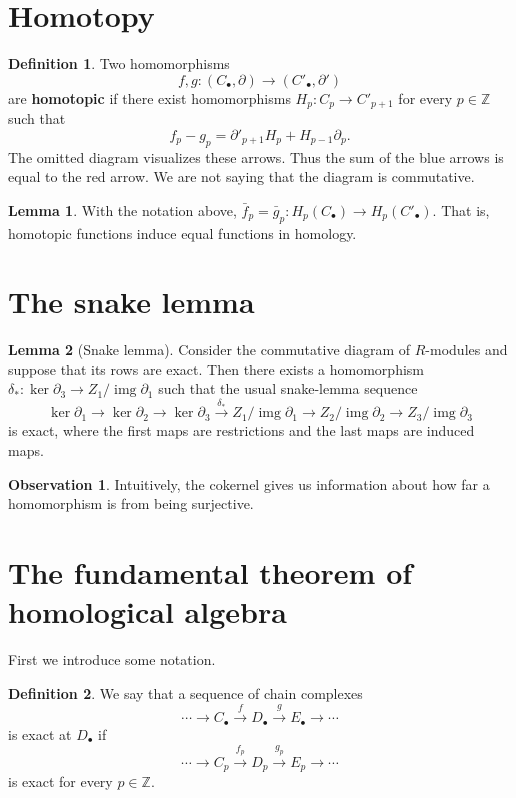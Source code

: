 \documentclass{book}
\theoremstyle{definition}
\newtheorem*{defn}{Definition}
\newtheorem*{lema}{Lemma}
\newtheorem*{obs}{Observation}
\newcommand{\Z}{\mathbb{Z}}
\DeclareMathOperator{\img}{img}
\begin{document}
\section{Homotopy}

\begin{defn}
Two homomorphisms
$$
f,g:(C_\bullet,\partial)\to(C'_\bullet,\partial')
$$
are \textbf{homotopic} if there exist homomorphisms
$H_p:C_p\to C'_{p+1}$ for every $p\in\Z$ such that
$$
f_p-g_p=\partial'_{p+1}H_p+H_{p-1}\partial_p.
$$
The omitted diagram visualizes these arrows. Thus the sum of
the blue arrows is equal to the red arrow. We are not saying
that the diagram is commutative.
\end{defn}

\begin{lema}
With the notation above,
$\bar f_p=\bar g_p:H_p(C_\bullet)\to H_p(C'_\bullet)$. That
is, homotopic functions induce equal functions in homology.
\end{lema}

\section{The snake lemma}

\begin{lema}[Snake lemma]
Consider the commutative diagram of $R$-modules and suppose
that its rows are exact. Then there exists a homomorphism
$\delta_*:\ker\partial_3\to Z_1/\img\partial_1$ such that the
usual snake-lemma sequence
$$
\ker\partial_1\to\ker\partial_2\to\ker\partial_3
\xrightarrow{\delta_*}
Z_1/\img\partial_1\to Z_2/\img\partial_2
\to Z_3/\img\partial_3
$$
is exact, where the first maps are restrictions and the last
maps are induced maps.
\end{lema}

\begin{obs}
Intuitively, the cokernel gives us information about how far
a homomorphism is from being surjective.
\end{obs}

\section{The fundamental theorem of homological algebra}

First we introduce some notation.

\begin{defn}
We say that a sequence of chain complexes
$$
\cdots\to C_\bullet\xrightarrow fD_\bullet
\xrightarrow gE_\bullet\to\cdots
$$
is exact at $D_\bullet$ if
$$
\cdots\to C_p\xrightarrow {f_p}D_p
\xrightarrow {g_p}E_p\to\cdots
$$
is exact for every $p\in\Z$.
\end{defn}
\end{document}
